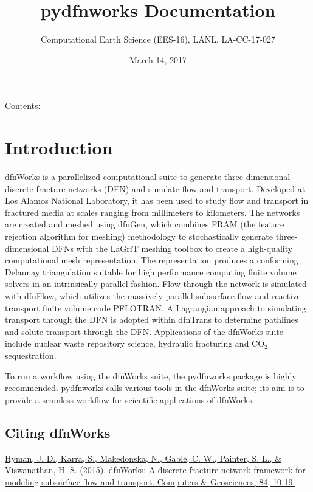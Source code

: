 \documentclass[letterpaper,10pt,english]{sphinxmanual}
\title{pydfnworks Documentation}
\date{March 14, 2017}
\author{Computational Earth Science (EES-16), LANL, LA-CC-17-027}
\begin{document}
\maketitle
\tableofcontents
{}\label{index::doc}


Contents:


\chapter{Introduction}
\label{intro:introduction}\label{intro:welcome-to-dfnworks-2-0-documentation}\label{intro::doc}
dfnWorks is a parallelized computational suite to generate three-dimensional discrete fracture networks (DFN) and simulate flow and transport. Developed at Los Alamos National Laboratory, it has been used to study flow and transport in fractured media at scales ranging from millimeters to kilometers. The networks are created and meshed using dfnGen, which combines FRAM (the feature rejection algorithm for meshing) methodology to stochastically generate three-dimensional DFNs with the LaGriT meshing toolbox to create a high-quality computational mesh representation. The representation produces a conforming Delaunay triangulation suitable for high performance computing finite volume solvers in an intrinsically parallel fashion. Flow through the network is simulated with dfnFlow, which utilizes the massively parallel subsurface flow and reactive transport finite volume code PFLOTRAN. A Lagrangian approach to simulating transport through the DFN is adopted within dfnTrans to determine pathlines and solute transport through the DFN. Applications of the dfnWorks suite include nuclear waste repository science, hydraulic fracturing and CO$_{\text{2}}$ sequestration.

To run a workflow using the dfnWorks suite, the pydfnworks package is highly recommended. pydfnworks calls various tools in the dfnWorks suite; its aim is to provide a seamless workflow for scientific applications of dfnWorks.


\section{Citing dfnWorks}
\label{intro:citing-dfnworks}
\href{http://www.sciencedirect.com/science/article/pii/S0098300415300261/}{Hyman, J. D., Karra, S., Makedonska, N., Gable, C. W., Painter, S. L., \& Viswanathan, H. S. (2015). dfnWorks: A discrete fracture network framework for modeling subsurface flow and transport. Computers \& Geosciences, 84, 10-19.}
\end{document}
